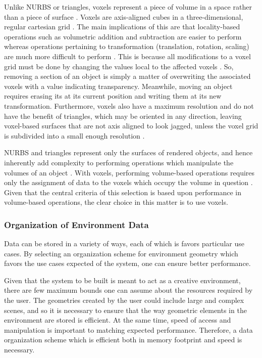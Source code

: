 \documentclass[onecolumn, draftclsnofoot,10pt, compsoc]{IEEEtran}
\newcounter{threesection}[subsubsection]
\begin{document}
Unlike NURBS or triangles, voxels represent a piece of volume in a space rather than a piece of surface \cite{braxTech1}.
Voxels are axis-aligned cubes in a three-dimensional, regular cartesian grid \cite{braxTech1}.
The main implications of this are that locality-based operations such as volumetric addition and subtraction are easier to perform whereas operations pertaining to transformation (translation, rotation, scaling) are much more difficult to perform \cite{braxTech1}.
This is because all modifications to a voxel grid must be done by changing the values local to the affected voxels \cite{braxTech1}.
So, removing a section of an object is simply a matter of overwriting the associated voxels with a value indicating transparency.
Meanwhile, moving an object requires erasing its at its current position and writing them at its new transformation.
Furthermore, voxels also have a maximum resolution and do not have the benefit of triangles, which may be oriented in any direction, leaving voxel-based surfaces that are not axis aligned to look jagged, unless the voxel grid is subdivided into a small enough resolution \cite{braxTech1}.




NURBS and triangles represent only the surfaces of rendered objects, and hence inherently add complexity to performing operations which manipulate the volumes of an object \cite{braxTech1}. With voxels, performing volume-based operations requires only the assignment of data to the voxels which occupy the volume in question \cite{braxTech1}. Given that the central criteria of this selection is based upon performance in volume-based operations, the clear choice in this matter is to use voxels. 


\subsubsection{Organization of Environment Data}

Data can be stored in a variety of ways, each of which is favors particular use cases. 
By selecting an organization scheme for environment geometry which favors the use cases expected of the system, one can ensure better performance.



Given that the system to be built is meant to act as a creative environment, there are few maximum bounds one can assume about the resources required by the user.
The geometries created by the user could include large and complex scenes, and so it is necessary to ensure that the way geometric elements in the environment are stored is efficient.
At the same time, speed of access and manipulation is important to matching expected performance.
Therefore, a data organization scheme which is efficient both in memory footprint and speed is necessary.
\end{document}
